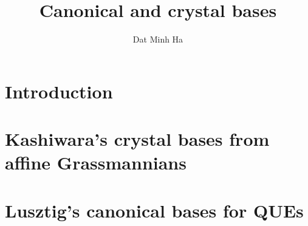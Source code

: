 

\setcounter{section}{-1}





    \title{Canonical and crystal bases}
    
    \author{Dat Minh Ha}
    \maketitle
    
    \begin{abstract}
    
    \end{abstract}
    
    {
    \hypersetup{} 
    \tableofcontents %
    }

    \section{Introduction}

    \section{Kashiwara's crystal bases from affine Grassmannians}

    \section{Lusztig's canonical bases for QUEs}
    
    \printbibliography

